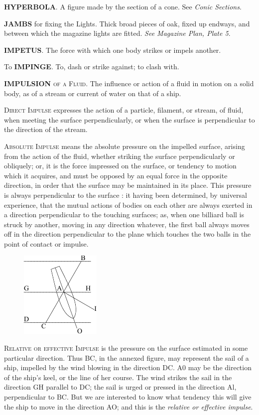 \textbf{HYPERBOLA}. A figure made by the section of a cone. See \textit{Conic Sections}.

\textbf{JAMBS} for fixing the Lights. Thick broad pieces of oak, fixed up endways, and between which the magazine lights are fitted. \textit{See Magazine Plan, Plate 5}. 

\textbf{IMPETUS}. The force with which one body strikes or impels another. 

To \textbf{IMPINGE}. To, dash or strike against; to clash with. 

\textbf{IMPULSION} \textsc{of a Fluid}. The influence or action of a fluid in motion on a solid body, as of a stream or current of water on that of a ship. 

\textsc{Direct Impulse} expresses the action of a particle, filament, or stream, of fluid, when meeting the surface perpendicularly, or when the surface is perpendicular to the direction of the stream. 

\textsc{Absolute Impulse} means the absolute pressure on the impelled surface, arising from the action of the fluid, whether striking the surface perpendicularly or obliquely; or, it is the force impressed on the surface, or tendency to motion which it acquires, and must be opposed by an equal force in the opposite direction, in order that the surface may be maintained in its place. This pressure is always perpendicular to the surface : it having been determined, by universal experience, that the mutual actions of bodies on each other are always exerted in a direction perpendicular to the touching surfaces; as, when one billiard ball is struck by another, moving in any direction whatever, the first ball always moves off in the direction perpendicular to the plane which touches the two balls in the point of contact or impulse. 

\begin{figure}
\begin{center}
\includegraphics[trim=0cm 0cm 0cm 0cm, clip]{pictures/Impulsion}
\end{center}
\end{figure}
\textsc{Relative or effective Impulse} is the pressure on the surface estimated in some particular direction. Thus BC, in the annexed figure, may represent the sail of a ship, impelled by the wind blowing in the direction DC. A0 may be the direction of the ship's keel, or the line of her course. The wind strikes the sail in the direction GH parallel to DC; the sail is urged or pressed in the direction Al, perpendicular to BC. But we are interested to know what tendency this will give the ship to move in the direction AO; and this is the \textit{relative or effective impulse}. 

